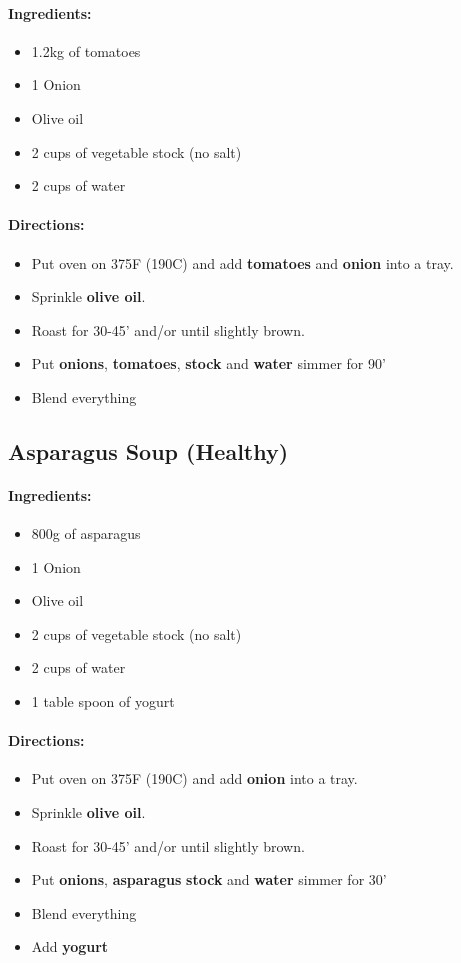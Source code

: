 \documentclass{article}
\begin{document}
\paragraph{Ingredients:}
\begin{itemize}
	\item 1.2kg of tomatoes
	\item 1 Onion
	\item Olive oil
	\item 2 cups of vegetable stock (no salt)
	\item 2 cups of water
\end{itemize}

\paragraph{Directions:}
\begin{itemize}
	\item Put oven on 375F (190C) and add \textbf{tomatoes} and \textbf{onion} into a tray.
	\item Sprinkle \textbf{olive oil}.
	\item Roast for 30-45' and/or until slightly brown.
	\item Put \textbf{onions}, \textbf{tomatoes}, \textbf{stock} and \textbf{water} simmer for 90'
	\item Blend everything
\end{itemize}

\subsection{Asparagus Soup (Healthy)}

\paragraph{Ingredients:}
\begin{itemize}
	\item 800g of asparagus
	\item 1 Onion
	\item Olive oil
	\item 2 cups of vegetable stock (no salt)
	\item 2 cups of water
	\item 1 table spoon of yogurt
\end{itemize}

\paragraph{Directions:}
\begin{itemize}
	\item Put oven on 375F (190C) and add \textbf{onion} into a tray.
	\item Sprinkle \textbf{olive oil}.
	\item Roast for 30-45' and/or until slightly brown.
	\item Put \textbf{onions}, \textbf{asparagus} \textbf{stock} and \textbf{water} simmer for 30'
	\item Blend everything
	\item Add \textbf{yogurt}
\end{itemize}
\end{document}

